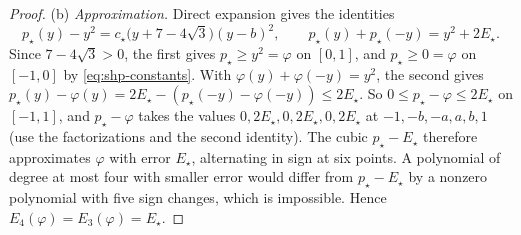 \begin{proof}
(b) \emph{Approximation.} Direct expansion gives the identities
\begin{equation}\label{eq:shp-p-identities}
  p_\star(y)-y^2=c_\star\bigl(y+7-4\sqrt3\bigr)(y-b)^2,\qquad
  p_\star(y)+p_\star(-y)=y^2+2E_\star .
\end{equation}
Since $7-4\sqrt3>0$, the first gives $p_\star\ge y^2=\varphi$ on $[0,1]$,
and $p_\star\ge0=\varphi$ on $[-1,0]$ by \eqref{eq:shp-constants}. With
$\varphi(y)+\varphi(-y)=y^2$, the second gives
$p_\star(y)-\varphi(y)=2E_\star-(p_\star(-y)-\varphi(-y))\le2E_\star$. So
$0\le p_\star-\varphi\le2E_\star$ on $[-1,1]$, and $p_\star-\varphi$ takes
the values $0,2E_\star,0,2E_\star,0,2E_\star$ at
$-1,-b,-a,a,b,1$ (use the factorizations and the second identity). The
cubic $p_\star-E_\star$ therefore approximates $\varphi$ with error
$E_\star$, alternating in sign at six points. A polynomial of degree at
most four with smaller error would differ from $p_\star-E_\star$ by a
nonzero polynomial with five sign changes, which is impossible. Hence
$E_4(\varphi)=E_3(\varphi)=E_\star$.


\end{proof}

